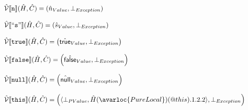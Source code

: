 \[\begin{array}{ll}
\aV\lbr \TT{n} \rbr(\hat{H},\hat{C}) = \left(\hat{n}_{Value},\bot_{Exception}\right)\\\\

\aV\lbr ``\TT{s}" \rbr(\hat{H},\hat{C}) = \left(\hat{s}_{Value},\bot_{Exception}\right)\\\\

\aV\lbr \TT{true} \rbr(\hat{H},\hat{C}) = \left(\atrue_{Value},\bot_{Exception}\right)\\\\

\aV\lbr \TT{false} \rbr(\hat{H},\hat{C}) = \left(\afalse_{Value},\bot_{Exception}\right)\\\\

\aV\lbr\TT{null}\rbr (\hat{H},\hat{C}) = \left(\anull_{Value},\bot_{Exception}\right)\\\\

\aV\lbr \TT{this}\rbr (\hat{H},\hat{C}) = \left(\langle\bot_{PValue},\hat{H}(\avarloc{PureLocal})(\varprop{this}).1.2.2\rangle,\bot_{Exception}\right)
\\\\
\end{array}
\]
